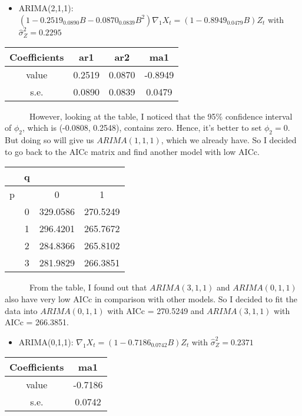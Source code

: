 \documentclass[
]{article}
\providecommand{\tightlist}{%
  \setlength{\itemsep}{0pt}\setlength{\parskip}{0pt}}
\begin{document}
\begin{itemize}
\tightlist
\item
  ARIMA(2,1,1):
  \((1-0.2519_{0.0890}B - 0.0870_{0.0839}B^2)\nabla_1X_t = (1-0.8949_{0.0479}B)Z_t\)
  with \(\hat{\sigma}^2_Z = 0.2295\)
\end{itemize}

\begin{longtable}[]{@{}cccc@{}}
\toprule\noalign{}
Coefficients & ar1 & ar2 & ma1 \\
\midrule\noalign{}
\endhead
\bottomrule\noalign{}
\endlastfoot
value & 0.2519 & 0.0870 & -0.8949 \\
s.e. & 0.0890 & 0.0839 & 0.0479 \\
\end{longtable}

~~~~~~However, looking at the table, I noticed that the 95\% confidence
interval of \(\phi_2\), which is (-0.0808, 0.2548), contains zero.
Hence, it's better to set \(\phi_2 = 0\). But doing so will give us
\(ARIMA(1,1,1)\), which we already have. So I decided to go back to the
AICc matrix and find another model with low AICc.

\begin{longtable}[]{@{}cccc@{}}
\toprule\noalign{}
& q & & \\
\midrule\noalign{}
\endhead
\bottomrule\noalign{}
\endlastfoot
p & & 0 & 1 \\
& 0 & 329.0586 & 270.5249 \\
& 1 & 296.4201 & 265.7672 \\
& 2 & 284.8366 & 265.8102 \\
& 3 & 281.9829 & 266.3851 \\
\end{longtable}

~~~~~~From the table, I found out that \(ARIMA(3,1,1)\) and
\(ARIMA(0,1,1)\) also have very low AICc in comparison with other
models. So I decided to fit the data into \(ARIMA(0,1,1)\) with AICc =
270.5249 and \(ARIMA(3,1,1)\) with AICc = 266.3851.

\begin{itemize}
\tightlist
\item
  ARIMA(0,1,1): \(\nabla_1X_t = (1-0.7186_{0.0742}B)Z_t\) with
  \(\hat{\sigma}^2_Z = 0.2371\)
\end{itemize}

\begin{longtable}[]{@{}cc@{}}
\toprule\noalign{}
Coefficients & ma1 \\
\midrule\noalign{}
\endhead
\bottomrule\noalign{}
\endlastfoot
value & -0.7186 \\
s.e. & 0.0742 \\
\end{longtable}
\end{document}
